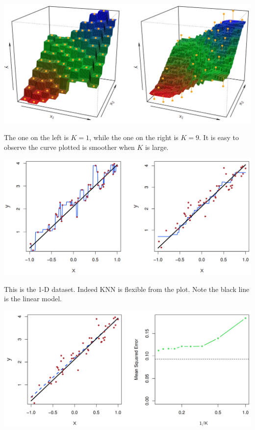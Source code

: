 \documentclass{article}
\theoremstyle{MyNonumberplain}
\theoremstyle{break}
\theoremstyle{break}
\begin{document}
\begin{center}
    \includegraphics*[scale=0.4]{Images/img14.png}
\end{center}

The one on the left is $K=1$, while the one on the right is $K=9$. It is easy to observe the curve plotted is smoother when $K$ is large.

\begin{center}
    \includegraphics*[scale=0.4]{Images/img15.png}
\end{center}

This is the 1-D dataset. Indeed KNN is flexible from the plot. Note the black line is the linear model.

\begin{center}
    \includegraphics*[scale=0.2]{Images/img16.png}
\end{center}
\end{document}
